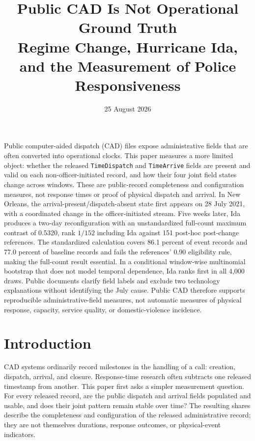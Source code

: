 \documentclass[11pt]{article}
\title{\vspace{-1.7em}\textbf{Public CAD Is Not Operational Ground Truth}\\[0.35em]
\large Regime Change, Hurricane Ida, and the Measurement of Police Responsiveness}
\author{}
\date{25 August 2026}
\begin{document}
\maketitle
\thispagestyle{plain}
\vspace{-1.3em}

\begin{plainbox}[title=Abstract]
Public computer-aided dispatch (CAD) files expose administrative fields that are often converted into operational clocks. This paper measures a more limited object: whether the released \texttt{TimeDispatch} and \texttt{TimeArrive} fields are present and valid on each non-officer-initiated record, and how their four joint field states change across windows. These are public-record completeness and configuration measures, not response times or proof of physical dispatch and arrival. In New Orleans, the arrival-present/dispatch-absent state first appears on 28 July 2021, with a coordinated change in the officer-initiated stream. Five weeks later, Ida produces a two-day reconfiguration with an unstandardized full-count maximum contrast of 0.5320, rank $1/152$ including Ida against 151 post-hoc post-change references. The standardized calculation covers 86.1 percent of event records and 77.0 percent of baseline records and fails the references' 0.90 eligibility rule, making the full-count result essential. In a conditional window-wise multinomial bootstrap that does not model temporal dependence, Ida ranks first in all 4,000 draws. Public documents clarify field labels and exclude two technology explanations without identifying the July cause. Public CAD therefore supports reproducible administrative-field measures, not automatic measures of physical response, capacity, service quality, or domestic-violence incidence.
\end{plainbox}


\section{Introduction}

CAD systems ordinarily record milestones in the handling of a call: creation, dispatch, arrival, and closure. Response-time research often subtracts one released timestamp from another. This paper first asks a simpler measurement question. For every released record, are the public dispatch and arrival fields populated and usable, and does their joint pattern remain stable over time? The resulting shares describe the completeness and configuration of the released administrative record; they are not themselves durations, response outcomes, or physical-event indicators.
\end{document}
